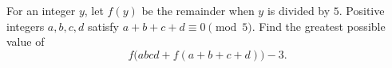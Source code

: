 For an integer $y$, let $f(y)$ be the remainder when $y$ is divided by $5$. Positive integers $a,b,c,d$ satisfy $a+b+c+d\equiv0\pmod5$. Find the greatest possible value of
\[
f\bigl(abcd+f(a+b+c+d)\bigr)-3 .
\]
